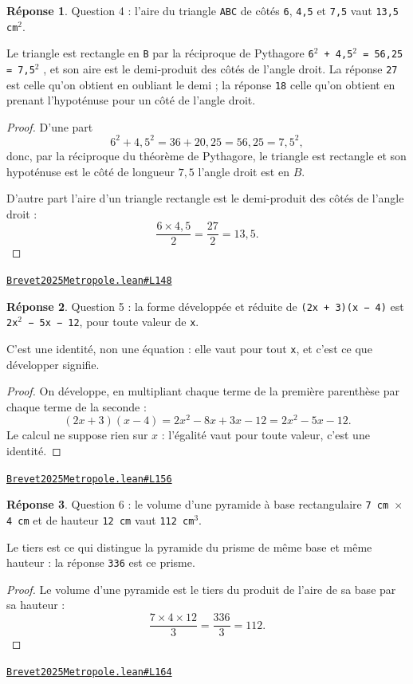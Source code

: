 \documentclass[11pt,a4paper]{article}
\theoremstyle{definition}
\theoremstyle{plain}
\theoremstyle{definition}
\newtheorem*{reponse}{Réponse}
\newcommand{\source}[2]{\par\smallskip\noindent\hfill{\footnotesize\href{#1}{\texttt{#2}}}\par\smallskip}
\begin{document}
\begin{reponse}
Question 4 : l'aire du triangle \texttt{ABC} de côtés \texttt{6}, \texttt{4,5} et \texttt{7,5} vaut
\texttt{13,5 cm\(^{2}\)}.

Le triangle est rectangle en \texttt{B} par la réciproque de Pythagore \textemdash{}
\texttt{6\(^{2}\) + 4,5\(^{2}\) = 56,25 = 7,5\(^{2}\)} \textemdash{}, et son aire est le demi-produit des côtés de l'angle
droit. La réponse \texttt{27} est celle qu'on obtient en oubliant le demi ; la réponse
\texttt{18} celle qu'on obtient en prenant l'hypoténuse pour un côté de l'angle droit.
\end{reponse}
\begin{proof}
D'une part
\[ 6^2 + 4{,}5^2 = 36 + 20{,}25 = 56{,}25 = 7{,}5^2 , \]
donc, par la réciproque du théorème de Pythagore, le triangle est rectangle et son
hypoténuse est le côté de longueur $7{,}5$ \textemdash{} l'angle droit est en $B$.

D'autre part l'aire d'un triangle rectangle est le demi-produit des côtés de l'angle
droit :
\[ \frac{6 \times 4{,}5}{2} = \frac{27}{2} = 13{,}5 . \]
\end{proof}
\source{https://github.com/Commutator-IO/learn-lean/blob/main/exams/2025/Brevet2025Metropole.lean\#L148}{Brevet2025Metropole.lean\#L148}

\begin{reponse}
Question 5 : la forme développée et réduite de \texttt{(2x + 3)(x − 4)} est
\texttt{2x\(^{2}\) − 5x − 12}, pour toute valeur de \texttt{x}.

C'est une identité, non une équation : elle vaut pour tout \texttt{x}, et c'est ce que
\og{} développer \fg{} signifie.
\end{reponse}
\begin{proof}
On développe, en multipliant chaque terme de la première parenthèse par chaque terme de la
seconde :
\[ (2x + 3)(x - 4) = 2x^2 - 8x + 3x - 12 = 2x^2 - 5x - 12 . \]
Le calcul ne suppose rien sur $x$ : l'égalité vaut pour toute valeur, c'est une identité.
\end{proof}
\source{https://github.com/Commutator-IO/learn-lean/blob/main/exams/2025/Brevet2025Metropole.lean\#L156}{Brevet2025Metropole.lean\#L156}

\begin{reponse}
Question 6 : le volume d'une pyramide à base rectangulaire \texttt{7 cm \(\times\) 4 cm} et de
hauteur \texttt{12 cm} vaut \texttt{112 cm\(^{3}\)}.

Le tiers est ce qui distingue la pyramide du prisme de même base et même hauteur :
la réponse \texttt{336} est ce prisme.
\end{reponse}
\begin{proof}
Le volume d'une pyramide est le tiers du produit de l'aire de sa base par sa hauteur :
\[ \frac{7 \times 4 \times 12}{3} = \frac{336}{3} = 112 . \]
\end{proof}
\source{https://github.com/Commutator-IO/learn-lean/blob/main/exams/2025/Brevet2025Metropole.lean\#L164}{Brevet2025Metropole.lean\#L164}
\end{document}

